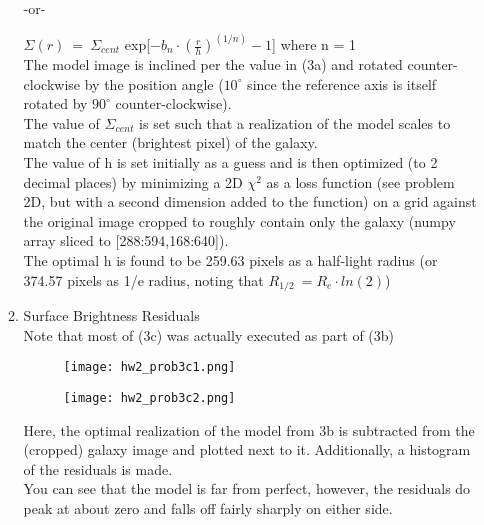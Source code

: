 \documentclass[11pt]{article}
\begin{document}
\begin{enumerate}
\begin{enumerate}
   -or-
   
   \hspace{10mm} $\Sigma (r)\ =\ \Sigma _{cent}$ exp[$-b_n \cdot (\frac{\displaystyle  r}{\displaystyle  h})^{(1/n)}-1$] where n = 1 \\
  
   The model image is inclined per the value in (3a) and rotated counter-clockwise by the position angle ($10^{\circ}$ since the reference axis is itself rotated by $90^{\circ}$ counter-clockwise).\\
   
   The value of $\Sigma _{cent}$ is set such that a realization of the model scales to match the center (brightest pixel) of the galaxy.\\
   
   The value of h is set initially as a guess and is then optimized (to 2 decimal places) by minimizing a 2D $\chi^2$ as a loss function (see problem 2D, but with a second dimension added to the function) on a grid against the original image cropped to roughly contain only the galaxy (numpy array sliced to [288:594,168:640]). \\
   
   The optimal h is found to be 259.63 pixels as a half-light radius (or 374.57 pixels as 1/e radius, noting that $R_{1/2}\ = R_e \cdot ln(2)$)\\
   
   \item Surface Brightness Residuals\\ %
   
   Note that most of (3c) was actually executed as part of (3b)
   
       		\begin{figure}[H]
     		    \texttt{[image: hw2\_prob3c1.png]}
     		    \caption{}
     		    \label{}
        		\end{figure}
  

         		\begin{figure}[H]
         		\centering
       		    \texttt{[image: hw2\_prob3c2.png]}
       		    \caption{}
       		    \label{}
          		\end{figure}

  Here, the optimal realization of the model from 3b is subtracted from the (cropped) galaxy image and plotted next to it. Additionally, a histogram of the residuals is made.\\
  
  You can see that the model is far from perfect, however, the residuals do peak at about zero and falls off fairly sharply on either side. \\
  

\end{enumerate}
\end{enumerate}
\end{document}
